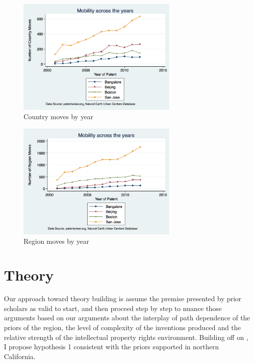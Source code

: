 \documentclass[12pt]{article}
\begin{document}
\begin{figure}[h]
\begin{centering}
  \includegraphics[width=0.7\textwidth]{countrymoves}
  \caption{Country moves by year}
   \label{fig:countrymoves}
\end{centering}
\end{figure}

\begin{figure}[h]
\begin{centering}
  \includegraphics[width=0.7\textwidth]{regionmoves}
  \caption{Region moves by year}
   \label{fig:regionmoves}
\end{centering}
\end{figure}


\section{Theory}
Our approach toward theory building is assume the premise presented by prior scholars as valid to start, and then proceed step by step to nuance those arguments based on our arguments about the interplay of path dependence of the priors of the region, the level of complexity of the inventions produced and the relative strength of the intellectual property rights environment.  Building off on \cite{Jaffe1993}, I propose hypothesis 1 consistent with the priors supported in northern California.
\end{document}
